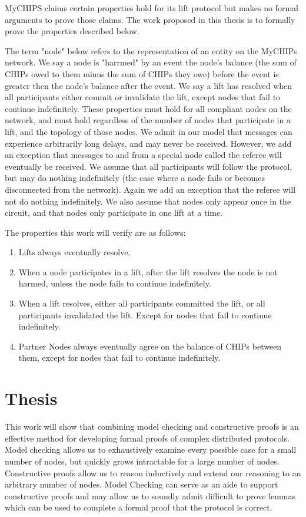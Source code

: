 \documentclass[article, onecolumn, 12pt]{IEEEtran}
\begin{document}
MyCHIPS claims certain properties hold for its lift protocol but makes no formal arguments to prove those claims. The work proposed in this thesis is to formally prove the properties described below.

The term "node" below refers to the representation of an entity on the MyCHIPs network. We say a node is "harrmed" by an event the node's balance (the sum of CHIPs owed to them minus the sum of CHIPs they owe) before the event is greater then the node's balance after the event. We say a lift has resolved when all participants either commit or invalidate the lift, except nodes that fail to continue indefinitely. These properties must hold for all compliant nodes on the network, and must hold regardless of the number of nodes that participate in a lift, and the topology of those nodes. We admit in our model that messages can experience arbitrarily long delays, and may never be received. However, we add an exception that messages to and from a special node called the referee will eventually be received.  We assume that all participants will follow the protocol, but may do nothing indefinitely (the case where a node fails or becomes disconnected from the network). Again we add an exception that the referee will not do nothing indefinitely. We also assume that nodes only appear once in the circuit, and that nodes only participate in one lift at a time. 

The properties this work will verify are as follows:

\begin{enumerate}
\item Lifts always eventually resolve. 
\item When a node participates in a lift, after the lift resolves the node is not harmed, unless the node fails to continue indefinitely. 
\item When a lift resolves, either all participants committed the lift, or all participants invalidated the lift. Except for nodes that fail to continue indefinitely.
\item Partner Nodes always eventually agree on the balance of CHIPs between them, except for nodes that fail to continue indefinitely.

\end{enumerate}

\section{Thesis}
This work will show that combining model checking and constructive proofs is an effective method for developing formal proofs of complex distributed protocols. Model checking allows us to exhaustively examine every possible case for a small number of nodes, but quickly grows intractable for a large number of nodes. Constructive proofs allow us to reason inductively and extend our reasoning to an arbitrary number of nodes. Model Checking can serve as an aide to support constructive proofs and may allow us to soundly admit difficult to prove lemmas which can be used to complete a formal proof that the protocol is correct.
\end{document}
